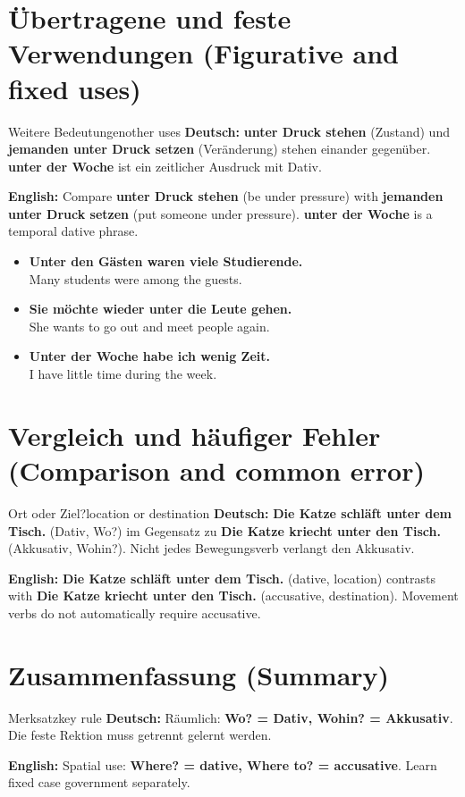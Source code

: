 \documentclass[a4paper,11pt]{article}
\newcommand{\GermanText}[1]{\textbf{Deutsch: }#1\par}
\newcommand{\EnglishText}[1]{{\small\color{SoftGray}\textbf{English: }#1\par}}
\newcommand{\ExampleItem}[2]{\item \textbf{#1}\\{\small\color{SoftGray}#2}}
\begin{document}
\section{Übertragene und feste Verwendungen (Figurative and fixed uses)}
\begin{grammarentry}{Weitere Bedeutungen}{other uses}
\GermanText{\textbf{unter Druck stehen} (Zustand) und \textbf{jemanden unter Druck setzen} (Veränderung) stehen einander gegenüber. \textbf{unter der Woche} ist ein zeitlicher Ausdruck mit Dativ.}
\EnglishText{Compare \textbf{unter Druck stehen} (be under pressure) with \textbf{jemanden unter Druck setzen} (put someone under pressure). \textbf{unter der Woche} is a temporal dative phrase.}
\end{grammarentry}
\begin{exbox}
\begin{itemize}
\ExampleItem{Unter den Gästen waren viele Studierende.}{Many students were among the guests.}
\ExampleItem{Sie möchte wieder unter die Leute gehen.}{She wants to go out and meet people again.}
\ExampleItem{Unter der Woche habe ich wenig Zeit.}{I have little time during the week.}
\end{itemize}
\end{exbox}
\section{Vergleich und häufiger Fehler (Comparison and common error)}
\begin{grammarentry}{Ort oder Ziel?}{location or destination}
\GermanText{\textbf{Die Katze schläft unter dem Tisch.} (Dativ, Wo?) im Gegensatz zu \textbf{Die Katze kriecht unter den Tisch.} (Akkusativ, Wohin?). Nicht jedes Bewegungsverb verlangt den Akkusativ.}
\EnglishText{\textbf{Die Katze schläft unter dem Tisch.} (dative, location) contrasts with \textbf{Die Katze kriecht unter den Tisch.} (accusative, destination). Movement verbs do not automatically require accusative.}
\end{grammarentry}
\section{Zusammenfassung (Summary)}
\begin{grammarentry}{Merksatz}{key rule}
\GermanText{Räumlich: \textbf{Wo? = Dativ, Wohin? = Akkusativ}. Die feste Rektion muss getrennt gelernt werden.}
\EnglishText{Spatial use: \textbf{Where? = dative, Where to? = accusative}. Learn fixed case government separately.}
\end{grammarentry}
\end{document}
